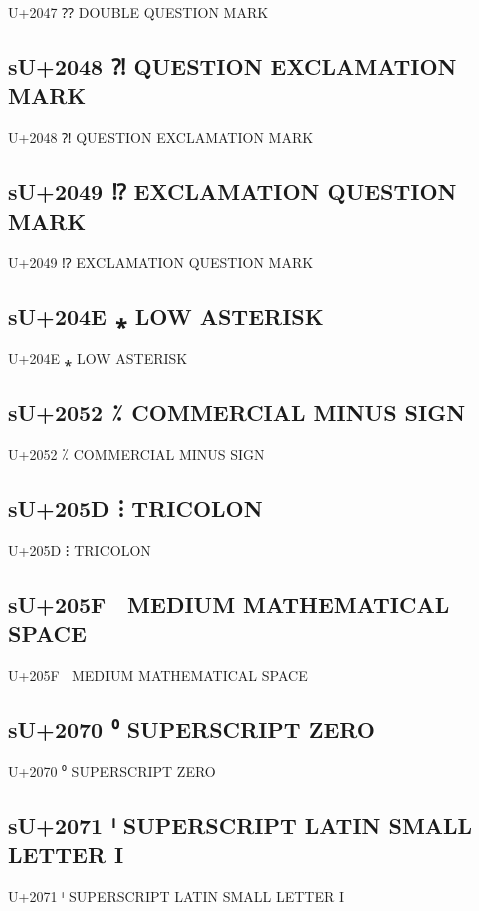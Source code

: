 U+2047 ⁇ DOUBLE QUESTION MARK

\subsection{sU+2048 ⁈ QUESTION EXCLAMATION MARK}

U+2048 ⁈ QUESTION EXCLAMATION MARK

\subsection{sU+2049 ⁉ EXCLAMATION QUESTION MARK}

U+2049 ⁉ EXCLAMATION QUESTION MARK

\subsection{sU+204E ⁎  LOW ASTERISK}

U+204E ⁎  LOW ASTERISK

\subsection{sU+2052 ⁒  COMMERCIAL MINUS SIGN}

U+2052 ⁒  COMMERCIAL MINUS SIGN

\subsection{sU+205D ⁝ TRICOLON}

U+205D ⁝ TRICOLON

\subsection{sU+205F   MEDIUM MATHEMATICAL SPACE}

U+205F   MEDIUM MATHEMATICAL SPACE

\subsection{sU+2070 ⁰ SUPERSCRIPT ZERO}

U+2070 ⁰ SUPERSCRIPT ZERO

\subsection{sU+2071 ⁱ SUPERSCRIPT LATIN SMALL LETTER I}

U+2071 ⁱ SUPERSCRIPT LATIN SMALL LETTER I

